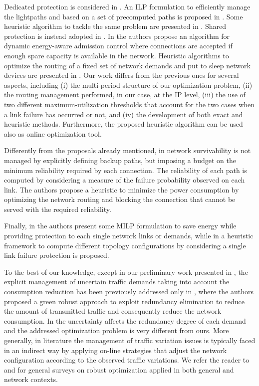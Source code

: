 \documentclass[final,5p,times,twocolumn]{elsarticle}
\begin{document}
Dedicated protection is considered in \cite{muhammad10,monti11a,jirattigalachote11}. An ILP formulation to efficiently manage the lightpaths and based on a set of precomputed paths is proposed in \cite{muhammad10}. Some heuristic algorithm to tackle the same problem are presented in \cite{monti11a,jirattigalachote11}. 
Shared protection is instead adopted in \cite{cavdar10,bao12,he13}. In \cite{he13} the authors propose an algorithm for dynamic energy-aware admission control where connections are accepted if enough spare capacity is available in the network. Heuristic algorithms to optimize the routing of a fixed set of network demands and put to sleep network devices are presented in \cite{cavdar10,bao12}. 
Our work differs from the previous ones for several aspects, including (i) the multi-period structure of our optimization problem, (ii) the routing management performed, in our case, at the IP level, (iii) the use of two different maximum-utilization thresholds that account for the two cases when a link failure has occurred or not, and (iv) the development of both exact and heuristic methods. Furthermore, the proposed heuristic algorithm can be used also as online optimization tool.

Differently from the proposals already mentioned, in \cite{wu12} network survivability is not managed by explicitly defining backup paths, but imposing a budget on the minimum reliability required by each connection. The reliability of each path is computed by considering a measure of the failure probability observed on each link. The authors propose a heuristic to minimize the power consumption by optimizing the network routing and blocking the connection that cannot be served with the required reliability.

Finally, in \cite{aldraho12} the authors present some MILP formulation to save energy while providing protection to each single network links or demands, while in \cite{francois13} a heuristic framework to compute different topology configurations by considering a single link failure protection is proposed. 

To the best of our knowledge, except in our preliminary work presented in \cite{addis13b}, the explicit management of uncertain traffic demands taking into account the consumption reduction has been  previously addressed only in \cite{coudert13}, where the authors proposed a green robust approach to exploit redundancy elimination to reduce the amount of transmitted traffic and consequently reduce the network consumption. In \cite{coudert13} the uncertainty affects the redundancy degree of each demand and the addressed optimization problem is very different from ours. More generally, in literature the management of traffic variation issues is typically faced in an indirect way by applying on-line strategies that adjust the network configuration according to the observed traffic variations. We refer the reader to \cite{bertsimas11} and \cite{ben09} for general surveys on robust optimization applied in both general and network contexts.
\end{document}

